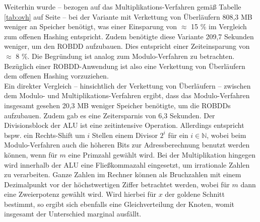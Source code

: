 Weiterhin wurde -- bezogen auf das Multiplikations-Verfahren gemäß Tabelle \ref{tab:ovh} auf Seite \pageref{tab:ovh} -- bei der Variante mit Verkettung von Überläufern 808,3 MB weniger an Speicher benötigt, was einer Einsparung von $\approx$ 15 \% im Vergleich zum offenen Hashing entspricht. Zudem benötigte diese Variante 209,7 Sekunden weniger, um den ROBDD aufzubauen. Dies entspricht einer Zeiteinsparung von $\approx$ 8 \%. Die Begründung ist analog zum Modulo-Verfahren zu betrachten. Bezüglich einer ROBDD-Anwendung ist also eine Verkettung von Überläufern dem offenen Hashing vorzuziehen.\\
Ein direkter Vergleich -- hinsichtlich der Verkettung von Überläufern -- zwischen dem Modulo- und Multiplikations-Verfahren ergibt, dass das Modulo-Verfahren insgesamt gesehen 20,3 MB weniger Speicher benötigte, um die ROBDDs aufzubauen. Zudem gab es eine Zeitersparnis von 6,3 Sekunden. Der Divisionsblock der ALU ist eine zeitintensive Operation. Allerdings entspricht bspw. ein Rechts-Shift um $i$ Stellen einem Divisor $2^i$ für ein $i \in \mathbb{N}$, wobei beim Modulo-Verfahren auch die höheren Bits zur Adressberechnung benutzt werden können, wenn für $m$ eine Primzahl gewählt wird. Bei der Multiplikation hingegen wird innerhalb der ALU eine Fließkommazahl eingesetzt, um irrationale Zahlen zu verarbeiten. Ganze Zahlen im Rechner können als Bruchzahlen mit einem Dezimalpunkt vor der höchstwertigen Ziffer betrachtet werden, wobei für $m$ dann eine Zweierpotenz gewählt wird. Wird hierbei für $x$ der goldene Schnitt bestimmt, so ergibt sich ebenfalls eine Gleichverteilung der Knoten, womit insgesamt der Unterschied marginal ausfällt.

